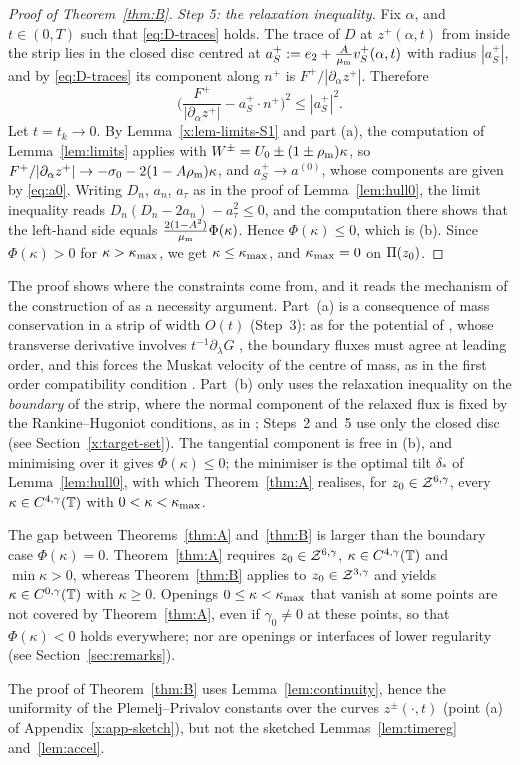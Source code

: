 \begin{proof}[Proof of Theorem~\ref{thm:B}]
\emph{Step 5: the relaxation inequality.} Fix $\alpha$, and $t\in(0,T)$ such that \eqref{eq:D-traces} holds. The trace of $D$ at $z^+(\alpha,t)$ from inside the strip lies in the closed disc
centred at $a_S^+:=e_2+\frac{A}{\mu_{\mathrm m}}v_S^+(\alpha,t)$ with radius $|a_S^+|$, and by \eqref{eq:D-traces} its component along $n^+$ is $F^+/|\partial_\alpha z^+|$. Therefore
\[
\Big(\frac{F^+}{|\partial_\alpha z^+|}-a_S^+\cdot n^+\Big)^2\le|a_S^+|^2 .
\]
Let $t=t_k\to0$. By Lemma~\ref{x:lem-limits-S1} and part (a), the computation of Lemma~\ref{lem:limits} applies with $W^\pm=U_0\pm(1\pm\rho_{\mathrm m})\kappa$, so
$F^+/|\partial_\alpha z^+|\to-\sigma_0-2(1-A\rho_{\mathrm m})\kappa$, and $a_S^+\to a^{(0)}$, whose components are given by \eqref{eq:a0}. Writing $D_n$, $a_n$, $a_\tau$ as in the proof of
Lemma~\ref{lem:hull0}, the limit inequality reads $D_n(D_n-2a_n)-a_\tau^2\le0$, and the computation there shows that the left-hand side equals $\frac{2(1-A^2)}{\mu_{\mathrm m}}\Phi(\kappa)$. Hence
$\Phi(\kappa)\le0$, which is (b). Since $\Phi(\kappa)>0$ for $\kappa>\kappa_{\max}$, we get $\kappa\le\kappa_{\max}$, and $\kappa_{\max}=0$ on $\Pi(z_0)$.
\end{proof}

\begin{remark}\label{x:rem-necessity}
The proof shows where the constraints come from, and it reads the mechanism of the construction of \cite{LM26} as a necessity argument. Part~(a) is a consequence of mass conservation in a
strip of width $O(t)$ (Step~3): as for the potential of \cite{LM26}, whose transverse derivative involves $t^{-1}\partial_\lambda G$ \cite[Sec.~3.3.4]{LM26}, the boundary fluxes must agree at
leading order, and this forces the Muskat velocity of the centre of mass, as in the first order compatibility condition \cite[Lemma~5.2]{LM26}. Part~(b) only uses the relaxation inequality on the
\emph{boundary} of the strip, where the normal component of the relaxed flux is fixed by the Rankine--Hugoniot conditions, as in \cite[(4.12)]{LM26}; Steps~2 and~5 use only the closed disc
(see Section~\ref{x:target-set}). The tangential component is free in (b), and minimising over it gives $\Phi(\kappa)\le0$; the minimiser is the optimal tilt $\delta_*$ of Lemma~\ref{lem:hull0},
with which Theorem~\ref{thm:A} realises, for $z_0\in\mathcal{Z}^{6,\gamma}$, every $\kappa\in C^{4,\gamma}(\mathbb{T})$ with $0<\kappa<\kappa_{\max}$.

The gap between Theorems~\ref{thm:A} and~\ref{thm:B} is larger than the boundary case $\Phi(\kappa)=0$. Theorem~\ref{thm:A} requires $z_0\in\mathcal{Z}^{6,\gamma}$, $\kappa\in C^{4,\gamma}(\mathbb{T})$ and
$\min\kappa>0$, whereas Theorem~\ref{thm:B} applies to $z_0\in\mathcal{Z}^{3,\gamma}$ and yields $\kappa\in C^{0,\gamma}(\mathbb{T})$ with $\kappa\ge0$. Openings $0\le\kappa<\kappa_{\max}$ that vanish at some points are
not covered by Theorem~\ref{thm:A}, even if $\gamma_0\ne0$ at these points, so that $\Phi(\kappa)<0$ holds everywhere; nor are openings or interfaces of lower regularity (see
Section~\ref{sec:remarks}).

The proof of Theorem~\ref{thm:B} uses Lemma~\ref{lem:continuity}, hence the uniformity of the Plemelj--Privalov constants over the curves $z^\pm(\cdot,t)$ (point (a) of
Appendix~\ref{x:app-sketch}), but not the sketched Lemmas~\ref{lem:timereg} and~\ref{lem:accel}.
\end{remark}
